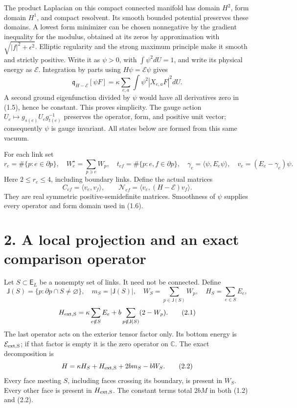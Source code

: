 \documentclass[
]{article}
\begin{document}
The product Laplacian on this compact connected manifold has domain
\(H^2\), form domain \(H^1\), and compact resolvent. Its smooth bounded
potential preserves these domains. A lowest form minimizer can be chosen
nonnegative by the gradient inequality for the modulus, obtained at its
zeros by approximation with \(\sqrt{|f|^2+\epsilon^2}\). Elliptic
regularity and the strong maximum principle make it smooth and strictly
positive. Write it as \(\psi>0\), with \(\int\psi^2dU=1\), and write its
physical energy as \(\mathcal E\). Integration by parts using
\(H\psi=\mathcal E\psi\) gives \[
\mathfrak q_{H-\mathcal E}[\psi F]
 =\kappa\sum_{e,a}\int\psi^2|X_{e,a}F|^2dU.                    \tag{1.5}
\] A second ground eigenfunction divided by \(\psi\) would have all
derivatives zero in (1.5), hence be constant. This proves simplicity.
The gauge action \(U_e\mapsto g_{s(e)}U_eg_{t(e)}^{-1}\) preserves the
operator, form, and positive unit vector; consequently \(\psi\) is gauge
invariant. All states below are formed from this same vacuum.

For each link set \[
r_e=\#\{p:e\in\partial p\},\quad
W_e^{\star}=\sum_{p\ni e}W_p,\quad
t_{ef}=\#\{p:e,f\in\partial p\},\quad
\gamma_e=\langle\psi,E_e\psi\rangle,\quad v_e=(E_e-\gamma_e)\psi.
\] Here \(2\le r_e\le4\), including boundary links. Define the actual
matrices \[
C_{ef}=\langle v_e,v_f\rangle,\qquad
\mathcal N_{ef}=\langle v_e,(H-\mathcal E)v_f\rangle.             \tag{1.6}
\] They are real symmetric positive-semidefinite matrices. Smoothness of
\(\psi\) supplies every operator and form domain used in (1.6).

\section{2. A local projection and an exact comparison
operator}\label{a-local-projection-and-an-exact-comparison-operator}

Let \(S\subset\mathsf E_L\) be a nonempty set of links. It need not be
connected. Define \[
\mathsf J(S)=\{p:\partial p\cap S\ne\varnothing\},\quad
m_S=|\mathsf J(S)|,\quad
W_S=\sum_{p\in\mathsf J(S)}W_p,\quad H_S=\sum_{e\in S}E_e,
\] \[
H_{\rm ext,S}=\kappa\sum_{e\notin S}E_e
       +b\sum_{p\notin\mathsf J(S)}(2-W_p).                    \tag{2.1}
\] The last operator acts on the exterior tensor factor only. Its bottom
energy is \(\mathcal E_{\rm ext,S}\); if that factor is empty it is the
zero operator on \(\mathbb C\). The exact decomposition is \[
H=\kappa H_S+H_{\rm ext,S}+2bm_S-bW_S.                          \tag{2.2}
\] Every face meeting \(S\), including faces crossing its boundary, is
present in \(W_S\). Every other face is present in \(H_{\rm ext,S}\).
The constant terms total \(2bM\) in both (1.2) and (2.2).
\end{document}

